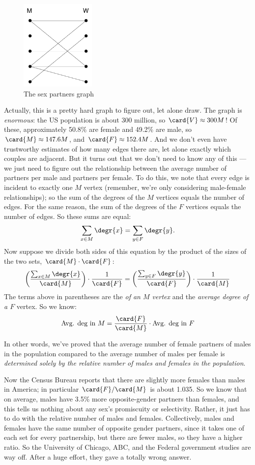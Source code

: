 \begin{figure}[htbp]
\centering \includegraphics[height=1.75in]{figures/sex-edges.pdf}
\caption{The sex partners graph}
\label{fig:partners}
\end{figure}

Actually, this is a pretty hard graph to figure out, let alone draw.  The
graph is \emph{enormous}: the US population is about 300 million, so
$\card{V} \approx 300M$!  Of these, approximately 50.8\% are female and
49.2\% are male, so $\card{M} \approx 147.6M$, and $\card{F} \approx
152.4M$.  And we don't even have trustworthy estimates of how many edges
there are, let alone exactly which couples are adjacent.
But it turns out that we don't need to know any of this ---we just need to
figure out the relationship between the average number of partners per
male and partners per female.  To do this, we note that every edge is
incident to exactly one $M$ vertex (remember, we're only considering
male-female relationships); so the sum of the degrees of the $M$ vertices
equals the number of edges.  For the same reason, the sum of the degrees
of the $F$ vertices equals the number of edges.  So these sums are equal:
%
\[
\sum_{x \in M} \degr{x} = \sum_{y \in F} \degr{y}.
\]
%
Now suppose we divide both sides of this equation by the product of
the sizes of the two sets, $\card{M} \cdot \card{F}$:
%
\[
\left(\frac{\sum_{x \in M} \degr{x}}{\card{M}}\right) \cdot \frac{1}{\card{F}} =
\left(\frac{\sum_{y \in F} \degr{y}}{\card{F}}\right) \cdot \frac{1}{\card{M}}
\]
%
The terms above in parentheses are the \emph{ of an
  $M$ vertex} and the \emph{average degree of a $F$} vertex.  So we know:
\[
\text{Avg. deg in $M$} = \frac{\card{F}}{\card{M}} \cdot \text{Avg. deg in $F$}
\]

In other words, we've proved that the average number of female partners of
males in the population compared to the average number of males per
female is \emph{determined solely by the relative number of males and
females in the population}.

Now the Census Bureau reports that there are slightly more females than
males in America; in particular $\card{F} / \card{M}$ is about 1.035.  So
we know that on average, males have 3.5\% more opposite-gender partners
than females, and this tells us nothing about any sex's promiscuity or
selectivity.  Rather, it just has to do with the relative number of males
and females.  Collectively, males and females have the same number of
opposite gender partners, since it takes one of each set for every
partnership, but there are fewer males, so they have a higher ratio.  So the
University of Chicago, ABC, and the Federal government studies are way
off.  After a huge effort, they gave a totally wrong answer.

